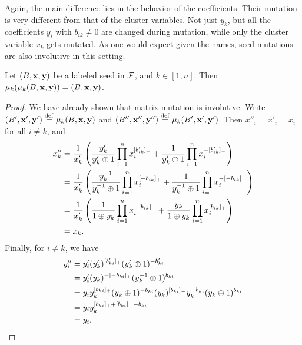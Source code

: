 Again, the main difference lies in the behavior of the coefficients. Their mutation is
very different from that of the cluster variables. Not just $y_k$, but all the coefficients $y_i$ with $b_{ik} \neq 0$ are changed
during mutation, while only the cluster variable $x_k$ gets mutated. As one would
expect given the names, seed mutations are also involutive in this setting.

\begin{proposition}\label{prop:seed_mutation_involutive}

	Let $(B, \mathbf{x}, \mathbf{y})$ be a labeled seed in $\mathcal{F}$, and $k \in [1, n]$. Then
	$\mu_k(\mu_k(B, \mathbf{x}, \mathbf{y})) = (B, \mathbf{x}, \mathbf{y})$.
\end{proposition}
\begin{proof}

	We have already shown that matrix mutation is involutive. Write $(B', \mathbf{x}', \mathbf{y}')
		\overset{\mathrm{def}}{=} \mu_k(B, \mathbf{x}, \mathbf{y})$ and $(B'', \mathbf{x}'', \mathbf{y}'') \overset{\mathrm{def}}{=} \mu_k(B', \mathbf{x}', \mathbf{y}')$. Then
	$x''_i = x'_i = x_i$ for all $i \neq k$, and
	\begin{align*}
		x_k''
		 & = \frac{1}{x_k'}\left(\frac{y'_k}{y'_k \oplus 1} \prod_{i=1}^n x_i^{[b'_{ik}]_{+}} + \frac{1}{y'_k \oplus 1}\prod_{i=1}^n x_i^{-[b'_{ik}]_{-}}\right)          \\
		 & = \frac{1}{x_k'}\left(\frac{y_k^{-1}}{y_k^{-1} \oplus 1} \prod_{i=1}^n x_i^{[-b_{ik}]_{+}} + \frac{1}{y_k^{-1} \oplus 1}\prod_{i=1}^n x_i^{-[-b_{ik}]_{-}}\right) \\
		 & = \frac{1}{x_k'}\left(\frac{1}{1 \oplus y_k} \prod_{i=1}^n x_i^{-[b_{ik}]_{-}} + \frac{y_k}{1 \oplus y_k}\prod_{i=1}^n x_i^{[b_{ik}]_{+}}\right)               \\
		 & = x_k.
	\end{align*}
	Finally, for $i \neq k$, we have
	\begin{align*}
		y''_i
		 & = y_i' (y'_k)^{[b'_{ki}]_{+}}(y'_k \oplus 1)^{-b'_{ki}}                                                   \\
		 & = y_i' (y_k)^{-[-b_{ki}]_{+}}(y_k^{-1} \oplus 1)^{b_{ki}}                                                  \\
		 & = y_i y_k^{[b_{ki}]_{+}}(y_k \oplus 1)^{-b_{ki}} (y_k)^{[b_{ki}]_{-}}y_k^{-b_{ki}}(y_k \oplus 1)^{b_{ki}} \\
		 & = y_i y_k^{[b_{ki}]_{+} + [b_{ki}]_{-} - b_{ki}}                                                          \\
		 & = y_i.
	\end{align*}
\end{proof}


